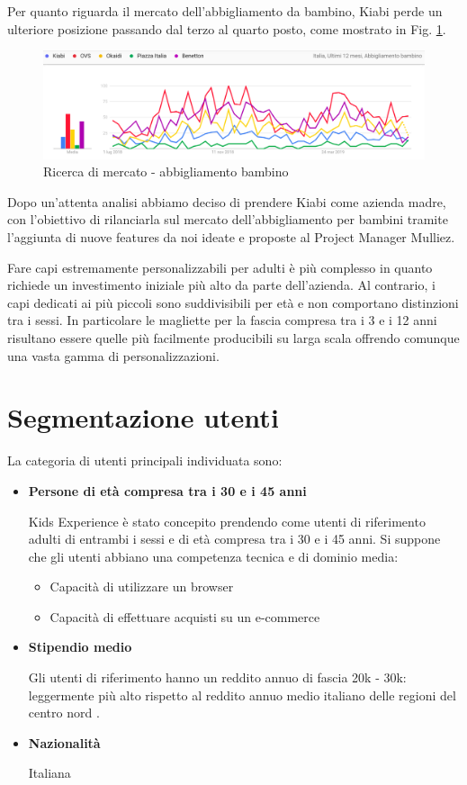 \documentclass[12pt,italian,]{report}
\providecommand{\tightlist}{%
  \setlength{\itemsep}{0pt}\setlength{\parskip}{0pt}}
\begin{document}
Per quanto riguarda il mercato dell'abbigliamento da bambino, Kiabi perde un ulteriore posizione passando dal terzo al quarto posto, come mostrato in Fig. \ref{abbigliamento_bambino}.

\begin{figure}[h]
\centering
\includegraphics{img/abbigliamento_bambino.png}
\caption{Ricerca di mercato - abbigliamento bambino}
\label{abbigliamento_bambino}
\end{figure}

Dopo un'attenta analisi abbiamo deciso di prendere Kiabi come azienda madre, con l'obiettivo di rilanciarla sul mercato dell'abbigliamento per bambini tramite l'aggiunta di nuove features da noi ideate e proposte al Project Manager Mulliez.

Fare capi estremamente personalizzabili per adulti è più complesso in quanto richiede un investimento iniziale più alto da parte dell'azienda. Al contrario, i capi dedicati ai più piccoli sono suddivisibili per età e non comportano distinzioni tra i sessi. In particolare le magliette per la fascia compresa tra i 3 e i 12 anni risultano essere quelle più facilmente producibili su larga scala offrendo comunque una vasta gamma di personalizzazioni.

\section{Segmentazione utenti}\label{segmentazione_utenti}

La categoria di utenti principali individuata sono:

\begin{itemize}
\item
  \textbf{Persone di età compresa tra i 30 e i 45 anni}

  Kids Experience è stato concepito prendendo come utenti di riferimento
  adulti di entrambi i sessi e di età compresa tra i 30 e i 45 anni. Si
  suppone che gli utenti abbiano una competenza tecnica e di dominio
  media:

  \begin{itemize}
  \tightlist
  \item
    Capacità di utilizzare un browser
  \item
    Capacità di effettuare acquisti su un e-commerce
  \end{itemize}
\item
  \textbf{Stipendio medio}

  Gli utenti di riferimento hanno un reddito annuo di fascia 20k - 30k:
  leggermente più alto rispetto al reddito annuo medio italiano delle
  regioni del centro nord \cite{redditomedio}.
\item
  \textbf{Nazionalità}

  Italiana
\end{itemize}
\end{document}
